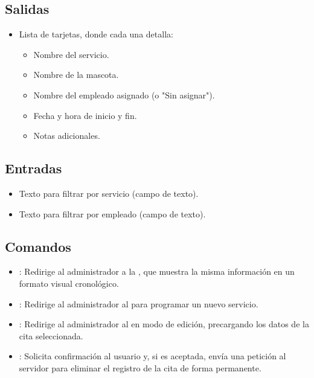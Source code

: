 \subsection{Salidas}
\begin{itemize}
    \item Lista de tarjetas, donde cada una detalla:
    \begin{itemize}
        \item Nombre del servicio.
        \item Nombre de la mascota.
        \item Nombre del empleado asignado (o "Sin asignar").
        \item Fecha y hora de inicio y fin.
        \item Notas adicionales.
    \end{itemize}
\end{itemize}

\subsection{Entradas}
\begin{itemize}
    \item Texto para filtrar por servicio (campo de texto).
    \item Texto para filtrar por empleado (campo de texto).
\end{itemize}

\subsection{Comandos}
\begin{itemize}
    \item {}: Redirige al administrador a la , que muestra la misma información en un formato visual cronológico.
    \item {}: Redirige al administrador al  para programar un nuevo servicio.
    \item {}: Redirige al administrador al  en modo de edición, precargando los datos de la cita seleccionada.
    \item {}: Solicita confirmación al usuario y, si es aceptada, envía una petición al servidor para eliminar el registro de la cita de forma permanente.
\end{itemize}

